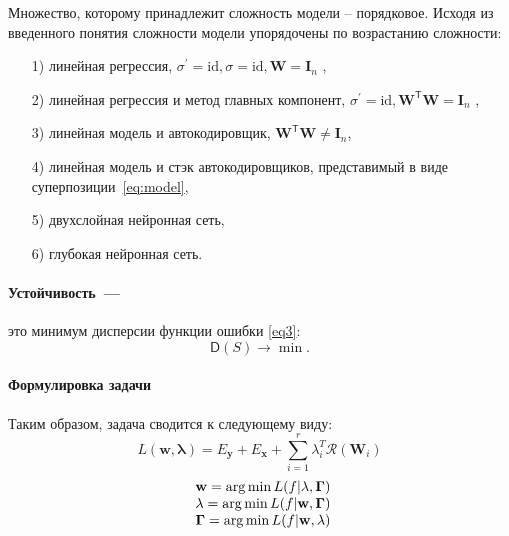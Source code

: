 \documentclass[12pt, twoside]{article}
\newcommand{\xb}{{\mathbf{x}}}
\newcommand{\yb}{{\mathbf{y}}}
\newcommand{\w}{{\mathbf{W}}}
\newcommand{\wm}{{\mathbf{w}}}
\DeclareMathOperator*{\argmin}{arg\,min}
\begin{document}
Множество, которому принадлежит сложность модели – порядковое. Исходя из введенного понятия сложности модели упорядочены 
по возрастанию сложности:
\begin{enumerate}
\item[1)] линейная регрессия,  $\sigma^{'} = \text{id}, \sigma = \text{id}, \w = \mathbf{I}_n $ ,
\item[2)] линейная регрессия и метод главных компонент, $\sigma^{'} = \text{id}, \w^\mathsf{T}\w = \mathbf{I}_n $ ,
\item[3)] линейная модель и автокодировщик, $\w^\mathsf{T}\w \neq \textbf{I}_n$,
\item[4)] линейная модель и стэк автокодировщиков, представимый в виде суперпозиции~\eqref{eq:model},
\item[5)] двухслойная нейронная сеть,
\item[6)] глубокая нейронная сеть.
\end{enumerate}



\paragraph{Устойчивость~---}это минимум дисперсии функции ошибки \eqref{eq3}:
\begin{equation}\label{eq103}
\mathsf{D}(S) \rightarrow \min.
\end{equation}
\paragraph{Формулировка задачи}
Таким образом, задача сводится к следующему виду:
\begin{equation}\label{eq:criterion_function}
L(\wm,\mathbf{\lambda}) = E_{\yb} + E_{\xb} +
\sum\limits_{i = 1}^r\mathbb{\lambda}_i^T\mathcal{R}(\mathbf{W}_i)
\end{equation}
\begin{equation}\label{eq:criterion_argmin}
\begin{array}{r@{}l}
\wm= \arg \min L(f| \mathbf{\lambda}, \mathbf{\Gamma})\\
\mathbf{\lambda }= \argmin L(f| \wm, \mathbf{\Gamma}) \\
\mathbf{\Gamma} = \argmin L(f| \wm, \mathbf{\lambda})
\end{array}
\end{equation}
\end{document}
